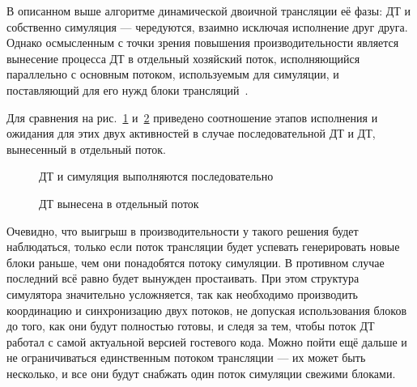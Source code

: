 В описанном выше алгоритме динамической двоичной трансляции её фазы: ДТ и собственно симуляция --- чередуются, взаимно исключая исполнение друг друга. Однако осмысленным с точки зрения повышения производительности является вынесение процесса ДТ в отдельный хозяйский поток, исполняющийся параллельно с основным потоком, используемым для симуляции, и поставляющий для его нужд блоки трансляций~\cite{pqemu2001}.

Для сравнения на рис.~\ref{fig:serial-bt} и~\ref{fig:parallel-bt} приведено соотношение этапов исполнения и ожидания для этих двух активностей в случае последовательной ДТ и ДТ, вынесенный в отдельный поток.

\begin{figure}[htb]
    \centering
{}
    \caption{ДТ и симуляция выполняются последовательно}
    \label{fig:serial-bt}
\end{figure}

\begin{figure}[htb]
    \centering
{}
    \caption{ДТ вынесена в отдельный поток}
    \label{fig:parallel-bt}
\end{figure}

Очевидно, что выигрыш в производительности у такого решения будет наблюдаться, только если поток трансляции будет успевать генерировать новые блоки раньше, чем они понадобятся потоку симуляции. В противном случае последний всё равно будет вынужден простаивать. При этом структура симулятора значительно усложняется, так как необходимо производить координацию и синхронизацию двух потоков, не допуская использования блоков до того, как они будут полностью готовы, и следя за тем, чтобы поток ДТ работал с самой актуальной версией гостевого кода. Можно пойти ещё дальше и не ограничиваться единственным потоком трансляции --- их может быть несколько, и все они будут снабжать один поток симуляции свежими блоками.

